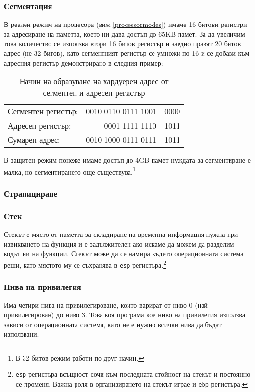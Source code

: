 \subsubsection{Сегментация} \label{segmentation}
В реален режим на процесора (виж \ref{processormodes}) имаме 16 битови регистри за адресиране на паметта, което ни дава достъп до 65KB памет. За да увеличим това количество се използва втори 16 битов регистър и заедно правят 20 битов адрес (не 32 битов), като сегментният регистър се умножи по 16 и се добави към адресния регистър демонстрирано в следния пример: \par
\begin{table}[ht]
  \centering
  \begin{tabular}{l r@{\hskip 3pt}l}
    Сегментен регистър: & 0010 0110 0111 1001 & \color{red}0000 \\
    Адресен регистър: & 0001 1111 1110 & 1011 \\
    \hline
    Сумарен адрес: & 0010 1000 0111 0111 & 1011 \\
  \end{tabular}
  \caption{Начин на образуване на хардуерен адрес от сегментен и адресен регистър}
  \label{segmentationexample}
\end{table}
В защитен режим понеже имаме достъп до 4GB памет нуждата за сегментиране е малка, но сегментирането още съществува.\footnote{В 32 битов режим работи по друг начин.}

\subsubsection{Странициране}

\subsubsection{Стек}
Стекът е място от паметта за складиране на временна информация нужна при извикването на функция и е задължителен ако искаме да можем да разделим кодът ни на функции. Стекът може да се намира където операционната система реши, като мястото му се съхранява в {\tt esp} регистъра.\footnote{{\tt esp} регистъра всъщност сочи към последната стойност на стекът и постоянно се променя. Важна роля в организирането на стекът играе и {\tt ebp} регистъра.}

\subsubsection{Нива на привилегия}
Има четири нива на привилегироване, които варират от ниво 0 (най-привилеги\-ро\-ван) до ниво 3. Това коя програма кое ниво на привилегия използва зависи от операционната система, като не е нужно всички нива да бъдат използвани.


